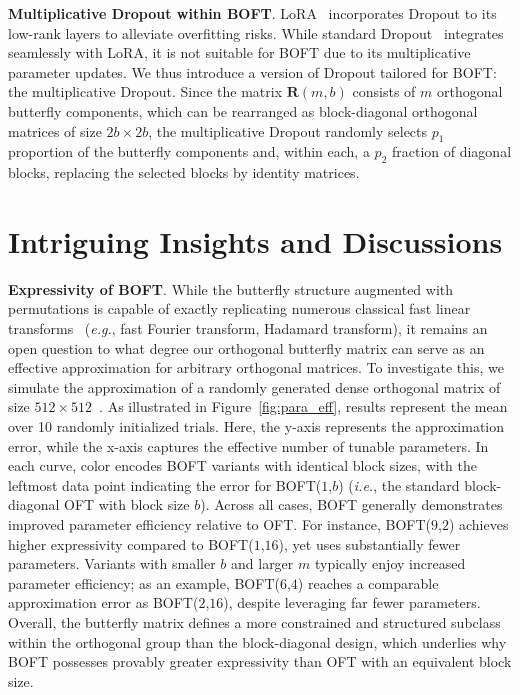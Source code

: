 \textbf{Multiplicative Dropout within BOFT}. LoRA~\cite{hulora2022} incorporates Dropout to its low-rank layers to alleviate overfitting risks. While standard Dropout~\cite{srivastava2014dropout} integrates seamlessly with LoRA, it is not suitable for BOFT due to its multiplicative parameter updates. We thus introduce a version of Dropout tailored for BOFT: the multiplicative Dropout. Since the matrix $\bm{R}(m,b)$ consists of $m$ orthogonal butterfly components, which can be rearranged as block-diagonal orthogonal matrices of size $2b \times 2b$, the multiplicative Dropout randomly selects $p_1$ proportion of the butterfly components and, within each, a $p_2$ fraction of diagonal blocks, replacing the selected blocks by identity matrices.

\section{Intriguing Insights and Discussions}

\textbf{Expressivity of BOFT}. While the butterfly structure augmented with permutations is capable of exactly replicating numerous classical fast linear transforms~\cite{dao2019learning,dao2019kaleidoscope} (\emph{e.g.}, fast Fourier transform, Hadamard transform), it remains an open question to what degree our orthogonal butterfly matrix can serve as an effective approximation for arbitrary orthogonal matrices. To investigate this, we simulate the approximation of a randomly generated dense orthogonal matrix of size $512\times 512$~\cite{anderson1987generation}. As illustrated in Figure~\ref{fig:para_eff}, results represent the mean over 10 randomly initialized trials. Here, the y-axis represents the approximation error, while the x-axis captures the effective number of tunable parameters. In each curve, color encodes BOFT variants with identical block sizes, with the leftmost data point indicating the error for BOFT($1$,$b$) (\emph{i.e.}, the standard block-diagonal OFT with block size $b$). Across all cases, BOFT generally demonstrates improved parameter efficiency relative to OFT. For instance, BOFT($9$,$2$) achieves higher expressivity compared to BOFT($1$,$16$), yet uses substantially fewer parameters. Variants with smaller $b$ and larger $m$ typically enjoy increased parameter efficiency; as an example, BOFT($6$,$4$) reaches a comparable approximation error as BOFT($2$,$16$), despite leveraging far fewer parameters. Overall, the butterfly matrix defines a more constrained and structured subclass within the orthogonal group than the block-diagonal design, which underlies why BOFT possesses provably greater expressivity than OFT with an equivalent block size.

